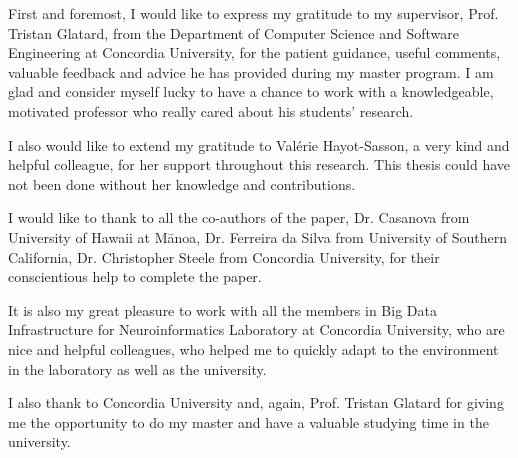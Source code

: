 \begin{acknowledgments}

First and foremost, I would like to express my gratitude to my supervisor, 
Prof. Tristan Glatard, from the Department of Computer Science and 
Software Engineering at Concordia University, for the patient guidance, 
useful comments, valuable feedback and advice he has provided 
during my master program. 
I am glad and consider myself lucky to have a chance to work 
with a knowledgeable, motivated professor who really cared about 
his students' research. 

I also would like to extend my gratitude to Val\'erie Hayot-Sasson, 
a very kind and helpful colleague, for her support throughout this research. 
This thesis could have not been done without her knowledge and contributions. 

I would like to thank to all the co-authors of the paper, Dr. Casanova from 
University of Hawaii at Mānoa, Dr. Ferreira da Silva from University of Southern California, 
Dr. Christopher Steele from Concordia University, for their conscientious help 
to complete the paper. 

It is also my great pleasure to work with all the members in Big Data 
Infrastructure for Neuroinformatics Laboratory at Concordia University, 
who are nice and helpful colleagues, who helped me to quickly adapt to 
the environment in the laboratory as well as the university. 

I also thank to Concordia University and, again, Prof. Tristan Glatard for 
giving me the opportunity to do my master and have a valuable 
studying time in the university.

\end{acknowledgments}